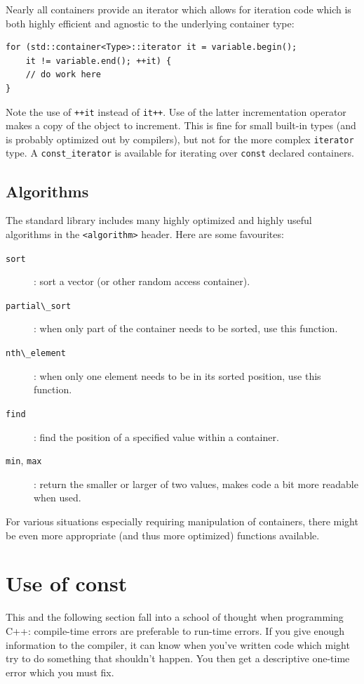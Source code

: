 \documentclass[10pt,a4paper]{book}
\begin{document}
Nearly all containers provide an iterator which allows for iteration code which is both highly efficient and agnostic to the underlying container type:

\begin{Verbatim}
for (std::container<Type>::iterator it = variable.begin();
    it != variable.end(); ++it) {
    // do work here
}
\end{Verbatim}

Note the use of \Verb`++it` instead of \Verb`it++`. Use of the latter incrementation operator makes a copy of the object to increment. This is fine for small built-in types (and is probably optimized out by compilers), but not for the more complex \Verb`iterator` type. A \Verb`const_iterator` is available for iterating over \verb`const` declared containers.

\subsection{Algorithms}

The standard library includes many highly optimized and highly useful algorithms in the \Verb`<algorithm>` header. Here are some favourites:

\begin{description}
	\item[\Verb`sort`]: sort a vector (or other random access container).
	\item[\Verb`partial\_sort`]: when only part of the container needs to be sorted, use this function.
	\item[\Verb`nth\_element`]: when only one element needs to be in its sorted position, use this function.
	\item[\Verb`find`]: find the position of a specified value within a container.
	\item[\Verb`min`, \Verb`max`]: return the smaller or larger of two values, makes code a bit more readable when used.
\end{description}

For various situations especially requiring manipulation of containers, there might be even more appropriate (and thus more optimized) functions available.

\section{Use of const}

This and the following section fall into a school of thought when programming C++: compile-time errors are preferable to run-time errors. If you give enough information to the compiler, it can know when you've written code which might try to do something that shouldn't happen. You then get a descriptive one-time error which you must fix.
\end{document}
